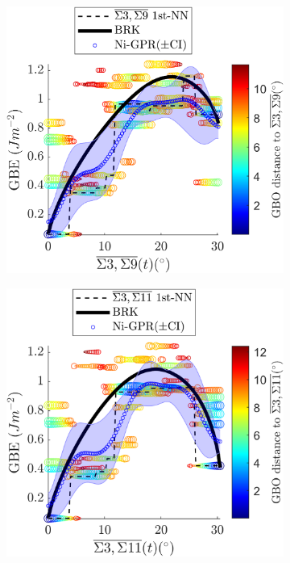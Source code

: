 \documentclass[final,twocolumn,12pt]{elsarticle}
\begin{document}
\begin{figure}[!htb]
		\begin{subfigure}[b]{0.48\textwidth}
			\includegraphics[width=\textwidth]{figures/tunnel-3-9-olmsted.png}
			\caption{}
			\label{fig:tunnel-3-9-olmsted}
		\end{subfigure}
		\hfill
		\begin{subfigure}[b]{0.48\textwidth}
			\includegraphics[width=\textwidth]{figures/tunnel-3-11-olmsted.png}

\end{subfigure}
\end{figure}
\end{document}
